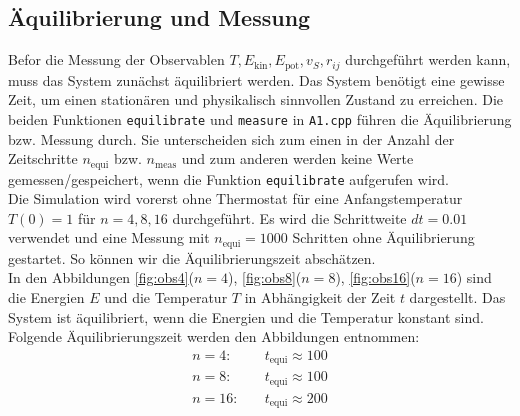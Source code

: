 \subsection{Äquilibrierung und Messung}
Befor die Messung der Observablen $T, E_\text{kin}, E_\text{pot}, v_S, r_{ij}$ durchgeführt werden kann, muss das System zunächst äquilibriert werden.
Das System benötigt eine gewisse Zeit, um einen stationären und physikalisch sinnvollen Zustand zu erreichen.
Die beiden Funktionen \texttt{equilibrate} und \texttt{measure} in \texttt{A1.cpp} führen die Äquilibrierung bzw. Messung durch.
Sie unterscheiden sich zum einen in der Anzahl der Zeitschritte $n_\text{equi}$ bzw. $n_\text{meas}$ und zum anderen werden keine Werte gemessen/gespeichert, wenn die Funktion \texttt{equilibrate} aufgerufen wird.
\\
Die Simulation wird vorerst ohne Thermostat für eine Anfangstemperatur $T(0)=1$ für $n=4,8,16$ durchgeführt.
Es wird die Schrittweite $dt=0.01$ verwendet und eine Messung mit $n_\text{equi}=1000$ Schritten ohne Äquilibrierung gestartet.
So können wir die Äquilibrierungszeit abschätzen.
\\
In den Abbildungen \ref{fig:obs4}($n=4$), \ref{fig:obs8}($n=8$), \ref{fig:obs16}($n=16$) sind die Energien $E$ und die Temperatur $T$ in Abhängigkeit der Zeit $t$ dargestellt.
Das System ist äquilibriert, wenn die Energien und die Temperatur konstant sind.
Folgende Äquilibrierungszeit werden den Abbildungen entnommen:
\begin{align*}
    n=4: \quad & t_\text{equi} \approx 100 \\
    n=8: \quad & t_\text{equi} \approx 100 \\
    n=16: \quad & t_\text{equi} \approx 200
\end{align*}

